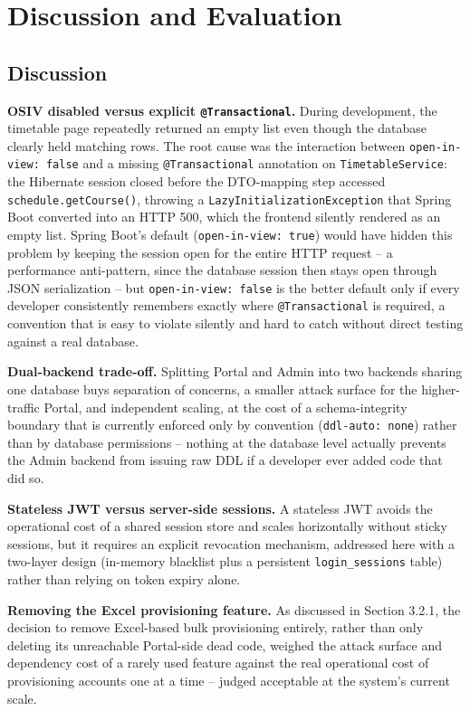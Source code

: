 \documentclass[12pt,a4paper]{report}
\begin{document}
\chapter{Discussion and Evaluation}

\section{Discussion}

\textbf{OSIV disabled versus explicit \texttt{@Transactional}.} During
development, the timetable page repeatedly returned an empty list even
though the database clearly held matching rows. The root cause was the
interaction between \texttt{open-in-view: false} and a missing
\texttt{@Transactional} annotation on \texttt{TimetableService}: the
Hibernate session closed before the DTO-mapping step accessed
\texttt{schedule.getCourse()}, throwing a
\texttt{LazyInitializationException} that Spring Boot converted into an
HTTP 500, which the frontend silently rendered as an empty list.
Spring Boot's default (\texttt{open-in-view: true}) would have hidden
this problem by keeping the session open for the entire HTTP request --
a performance anti-pattern, since the database session then stays open
through JSON serialization -- but \texttt{open-in-view: false} is the
better default only if every developer consistently remembers exactly
where \texttt{@Transactional} is required, a convention that is easy to
violate silently and hard to catch without direct testing against a
real database.

\textbf{Dual-backend trade-off.} Splitting Portal and Admin into two
backends sharing one database buys separation of concerns, a smaller
attack surface for the higher-traffic Portal, and independent scaling,
at the cost of a schema-integrity boundary that is currently enforced
only by convention (\texttt{ddl-auto: none}) rather than by database
permissions -- nothing at the database level actually prevents the
Admin backend from issuing raw DDL if a developer ever added code that
did so.

\textbf{Stateless JWT versus server-side sessions.} A stateless JWT
avoids the operational cost of a shared session store and scales
horizontally without sticky sessions, but it requires an explicit
revocation mechanism, addressed here with a two-layer design (in-memory
blacklist plus a persistent \texttt{login\_sessions} table) rather than
relying on token expiry alone.

\textbf{Removing the Excel provisioning feature.} As discussed in
Section 3.2.1, the decision to remove Excel-based bulk provisioning
entirely, rather than only deleting its unreachable Portal-side dead
code, weighed the attack surface and dependency cost of a rarely used
feature against the real operational cost of provisioning accounts one
at a time -- judged acceptable at the system's current scale.
\end{document}

